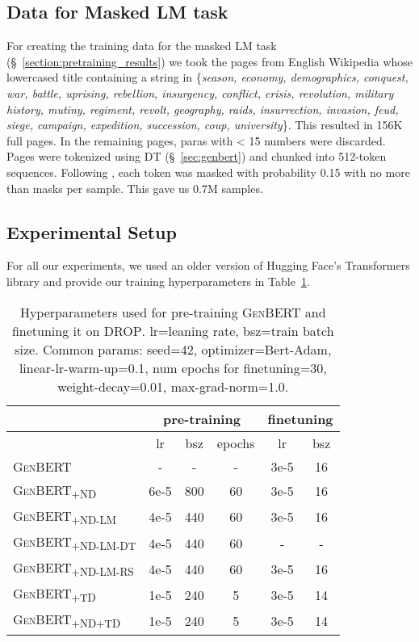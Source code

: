 \documentclass[11pt,a4paper]{article}
\newcommand\ssc[1]{\textsubscript{\textsc{#1}}}
\newcommand\genbert{\textsc{GenBERT}}
\newcommand\drop{\textsc{DROP}}
\begin{document}
\subsection{Data for Masked LM task}\label{sec:mlm_data}
For creating the training data for the masked LM task (\S~\ref{section:pretraining_results}) we took the pages from English Wikipedia whose lowercased title containing a string in \{\textit{season, economy, demographics, conquest, war, battle, uprising, rebellion, insurgency, conflict, crisis, revolution, military history, mutiny, regiment, revolt, geography, raids, insurrection, invasion, feud, siege, campaign, expedition, succession, coup, university}\}. This resulted in 156K full pages. In the remaining pages, paras with < 15 numbers were discarded. Pages were tokenized using DT (\S~\ref{sec:genbert}) and chunked into 512-token sequences. Following \citet{devlin2018bert}, each token was masked with probability 0.15 with no more than  masks per sample. This gave us 0.7M samples.



\subsection{Experimental Setup}\label{sec:exp_setup}
For all our experiments, we used an older version of Hugging Face's Transformers library \cite{Wolf2019HuggingFacesTS} and provide our training hyperparameters in Table~\ref{table:hyperparams}.
\begin{table}[t]\setlength{\belowcaptionskip}{-5pt}
    \scriptsize
    \centering
    \begin{tabular}{l|c|c|c|c|c|}
         & \multicolumn{3}{c|}{pre-training} & \multicolumn{2}{c|}{finetuning} \\
         \hline
         & lr & bsz & epochs & lr & bsz \\ \hline
         \textsc{GenBERT} & - & - & - & 3e-5 & 16 \\
         \textsc{GenBERT\ssc{+ND}} & 6e-5 & 800 & 60 & 3e-5 & 16 \\
         \textsc{GenBERT\ssc{+ND-LM}} & 4e-5 & 440 & 60 & 3e-5 & 16 \\
         \textsc{GenBERT\ssc{+ND-LM-DT}} & 4e-5 & 440 & 60 & - & - \\
         \textsc{GenBERT\ssc{+ND-LM-RS}} & 4e-5 & 440 & 60 & 3e-5 & 16 \\
         \textsc{GenBERT\ssc{+TD}} & 1e-5 & 240 & 5 & 3e-5 & 14 \\
         \textsc{GenBERT\ssc{+ND+TD}} & 1e-5 & 240 & 5 & 3e-5 & 14 \\
    \end{tabular}
    \caption{Hyperparameters used for pre-training \genbert{} and finetuning it on \drop{}. lr=leaning rate, bsz=train batch size. Common params: seed=42, optimizer=Bert-Adam, linear-lr-warm-up=0.1, num epochs for finetuning=30, weight-decay=0.01, max-grad-norm=1.0.}
    \label{table:hyperparams}
\end{table}
\end{document}

